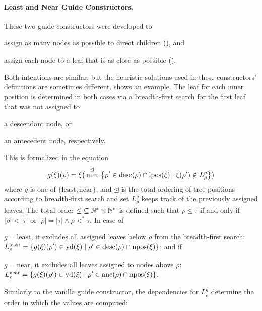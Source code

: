 \documentclass[../../document.tex]{subfiles}
\begin{document}
    \paragraph{Least and Near Guide Constructors.}
    These two guide constructors were developed to
    \begin{inparaenum}
        \item assign as many nodes as possible to direct children (), and
        \item assign each node to a leaf that is as close as possible ().
    \end{inparaenum}
    Both intentions are similar, but the heuristic solutions used in these constructors' definitions are sometimes different.
     shows an example.
    The leaf for each inner position is determined in both cases via a breadth-first search for the first leaf that was not assigned to
    \begin{inparaenum}
        \item a descendant node, or
        \item an antecedent node, respectively.
    \end{inparaenum}
    This is formalized in the equation
    \[
    g(\xi)(\rho) = \xi\big( \min^{\unlhd} \: \big\{\rho' \in \operatorname{desc}(\rho) \cap \operatorname{lpos}(\xi) \mid \xi(\rho') \notin L^g_\rho \big\} \big)
    \]
    where \(g\) is one of \(\{\mathrm{least}, \mathrm{near}\}\), and \(\unlhd\) is the total ordering of tree positions according to breadth-first search and set \(L^g_\rho\) keeps track of the previously assigned leaves.
    The total order \(\unlhd \subseteq \mathbb{N}^* \times \mathbb{N}^*\) is defined such that \(\rho \unlhd \tau\) if and only if \(|\rho| < |\tau|\) or \(|\rho| = |\tau| \land \rho <^* \tau\).
    In case of
    \begin{inparaenum}
        \item \(g = \mathrm{least}\), it excludes all assigned leaves below \(\rho\) from the breadth-first search:
        \(L^{\text{least}}_\rho = \{ g(\xi)(\rho') \in \operatorname{yd}(\xi) \mid \rho' \in \operatorname{desc}(\rho) \cap \operatorname{npos}(\xi) \}\); and if
        \item \(g = \mathrm{near}\), it excludes all leaves assigned to nodes above \(\rho\):
        \(L^{\text{near}}_\rho = \{ g(\xi)(\rho') \in \operatorname{yd}(\xi) \mid \rho' \in \operatorname{anc}(\rho) \cap \operatorname{npos}(\xi) \}\).
    \end{inparaenum}
    Similarly to the vanilla guide constructor, the dependencies for \(L^g_\rho\) determine the order in which the values are computed:
\end{document}
